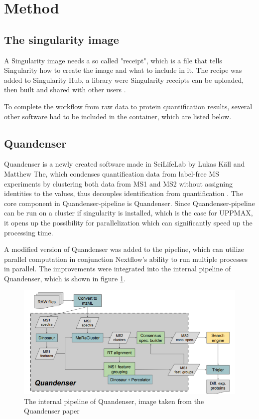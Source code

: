 \section{Method}

\subsection{The singularity image}
A Singularity image needs a so called "receipt", which is a file that tells Singularity how to create the image and what to include in it. The recipe was added to Singularity Hub, a library were Singularity receipts can be uploaded, then built and shared with other users \cite{singularity-hub}.

To complete the workflow from raw data to protein quantification results, several other software had to be included in the container, which are listed below.

\subsection{Quandenser} \label{ssec:quandenser-method}
Quandenser is a newly created software made in SciLifeLab by Lukas Käll and Matthew The, which condenses quantification data from label-free MS experiments by clustering both data from MS1 and MS2 without assigning identities to the values, thus decouples identification from quantification \cite{quandenser}. The core component in Quandenser-pipeline is Quandenser. Since Quandenser-pipeline can be run on a cluster if singularity is installed, which is the case for UPPMAX, it opens up the possibility for parallelization which can significantly speed up the processing time.

A modified version of Quandenser was added to the pipeline, which can utilize parallel computation in conjunction Nextflow's ability to run multiple processes in parallel. The improvements were integrated into the internal pipeline of Quandenser, which is shown in figure \ref{fig:quandenser-internal-pipeline}.

\begin{figure}[H]
  \centering
  \includegraphics[width=\linewidth]{pictures/quandenser-internal.png}
  \caption{The internal pipeline of Quandenser, image taken from the Quandenser paper \cite{quandenser}}
  \label{fig:quandenser-internal-pipeline}
\end{figure}

